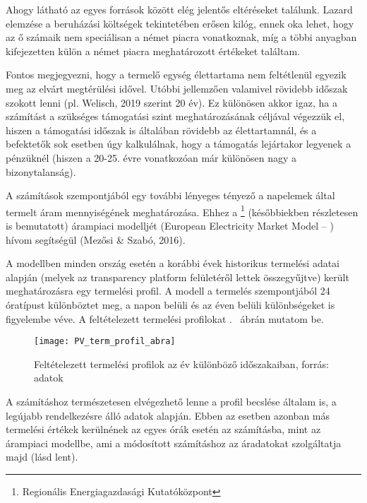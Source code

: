 \documentclass[twoside, magyar, showtrims]{corvinusphd}
\theoremstyle{plain}
\theoremstyle{remark}
\theoremstyle{definition}
\begin{document}

Ahogy látható az egyes források között
elég jelentős eltéréseket találunk.
Lazard elemzése a beruházási költségek
tekintetében erősen kilóg,
ennek oka lehet, hogy az ő számaik nem
speciálisan a német piacra vonatkoznak,
míg a többi anyagban kifejezetten külön
a német piacra meghatározott értékeket találtam. 

Fontos megjegyezni, hogy a termelő egység élettartama
nem feltétlenül egyezik meg az elvárt megtérülési idővel.
Utóbbi jellemzően valamivel rövidebb időszak
szokott lenni (pl. Welisch, 2019 szerint 20 év).
Ez különösen akkor igaz, ha a számítást a
szükséges támogatási szint meghatározásának céljával végezzük el,
hiszen a támogatási időszak is általában
rövidebb az élettartamnál, és a befektetők sok
esetben úgy kalkulálnak, hogy a támogatás lejártakor
legyenek a pénzüknél (hiszen a 20-25. évre vonatkozóan
már különösen nagy a bizonytalanság).

A számítások szempontjából egy további lényeges tényező a napelemek
által termelt áram mennyiségének meghatározása.
Ehhez a \footnote{Regionális Energiagazdasági Kutatóközpont}
(későbbiekben részletesen is bemutatott)
árampiaci modelljét (European Electricity Market Model -- )
hívom segítségül (Mezősi \& Szabó, 2016).

A modellben minden ország esetén a korábbi évek historikus termelési adatai alapján
(melyek az  transparency platform felületéről lettek összegyűjtve) került
meghatározásra egy termelési profil.
A modell a  termelés szempontjából 24 óratípust különböztet meg,
a napon belüli és az éven belüli különbségeket is figyelembe véve. 
A feltételezett termelési profilokat .~ ábrán mutatom be.

\begin{figure}
    \centering
    \texttt{[image: PV\_term\_profil\_abra]}
    \caption{Feltételezett termelési profilok az év különböző időszakaiban, forrás:  adatok}
    \label{fig:profilok}
\end{figure}

A számításhoz természetesen elvégezhető lenne a profil becslése általam is,
a legújabb rendelkezésre álló adatok alapján.
Ebben az esetben azonban más termelési értékek kerülnének
az egyes órák esetén az  számításba,
mint az árampiaci modellbe, ami a módosított  számításhoz
az áradatokat szolgáltatja majd (lásd lent).
\end{document}
